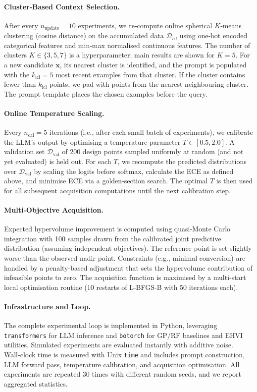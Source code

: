 \documentclass{article}
\begin{document}
\paragraph{Cluster-Based Context Selection.}
After every $n_{\text{update}}=10$ experiments, we re‑compute online spherical $K$‑means clustering (cosine distance) on the accumulated data $\mathcal{D}_n$, using one‑hot encoded categorical features and min‑max normalised continuous features. The number of clusters $K\in\{3,5,7\}$ is a hyperparameter; main results are shown for $K=5$. For a new candidate $\mathbf{x}$, its nearest cluster is identified, and the prompt is populated with the $k_{\text{icl}}=5$ most recent examples from that cluster. If the cluster contains fewer than $k_{\text{icl}}$ points, we pad with points from the nearest neighbouring cluster. The prompt template places the chosen examples before the query.

\paragraph{Online Temperature Scaling.}
Every $n_{\text{cal}}=5$ iterations (i.e., after each small batch of experiments), we calibrate the LLM’s output by optimising a temperature parameter $T\in[0.5,2.0]$. A validation set $\mathcal{D}_{\text{val}}$ of 200 design points sampled uniformly at random (and not yet evaluated) is held out. For each $T$, we recompute the predicted distributions over $\mathcal{D}_{\text{val}}$ by scaling the logits before softmax, calculate the ECE as defined above, and minimise ECE via a golden‑section search. The optimal $T$ is then used for all subsequent acquisition computations until the next calibration step.

\paragraph{Multi‑Objective Acquisition.}
Expected hypervolume improvement is computed using quasi‑Monte Carlo integration with 100 samples drawn from the calibrated joint predictive distribution (assuming independent objectives). The reference point is set slightly worse than the observed nadir point. Constraints (e.g., minimal conversion) are handled by a penalty‑based adjustment that sets the hypervolume contribution of infeasible points to zero. The acquisition function is maximised by a multi‑start local optimisation routine (10 restarts of L‑BFGS‑B with 50 iterations each).

\paragraph{Infrastructure and Loop.}
The complete experimental loop is implemented in Python, leveraging \texttt{transformers} for LLM inference and \texttt{botorch} for GP/RF baselines and EHVI utilities. Simulated experiments are evaluated instantly with additive noise. Wall‑clock time is measured with Unix \texttt{time} and includes prompt construction, LLM forward pass, temperature calibration, and acquisition optimisation. All experiments are repeated 30 times with different random seeds, and we report aggregated statistics.
\end{document}
